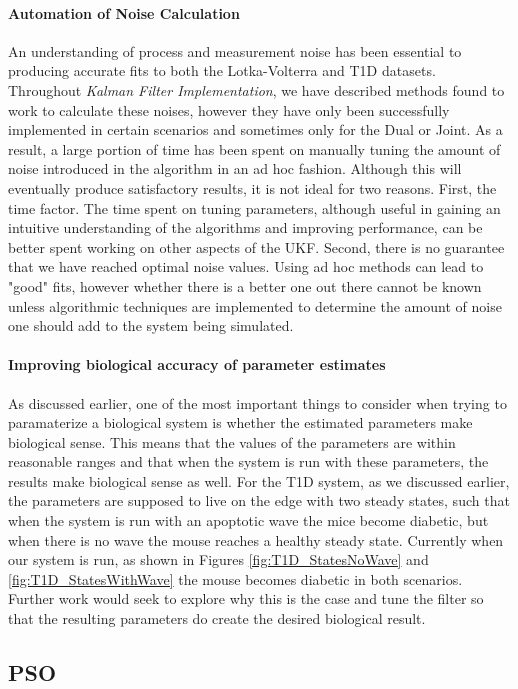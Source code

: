 \documentclass{article}
\begin{document}
\paragraph{Automation of Noise Calculation}
An understanding of process and measurement noise has been essential to producing accurate fits to both the Lotka-Volterra and T1D datasets. Throughout \emph{Kalman Filter Implementation}, we have described methods found to work to calculate these noises, however they have only been successfully implemented in certain scenarios and sometimes only for the Dual or Joint. As a result, a large portion of time has been spent on manually tuning the amount of noise introduced in the algorithm in an ad hoc fashion. Although this will eventually produce satisfactory results, it is not ideal for two reasons. First, the time factor. The time spent on tuning parameters, although useful in gaining an intuitive understanding of the algorithms and improving performance, can be better spent working on other aspects of the UKF. Second, there is no guarantee that we have reached optimal noise values. Using ad hoc methods can lead to "good" fits, however whether there is a better one out there cannot be known unless algorithmic techniques are implemented to determine the amount of noise one should add to the system being simulated.

\paragraph{Improving biological accuracy of parameter estimates}
As discussed earlier, one of the most important things to consider when trying to paramaterize a biological system is whether the estimated parameters make biological sense. This means that the values of the parameters are within reasonable ranges and that when the system is run with these parameters, the results make biological sense as well. For the T1D system, as we discussed earlier, the parameters are supposed to live on the edge with two steady states, such that when the system is run with an apoptotic wave the mice become diabetic, but when there is no wave the mouse reaches a healthy steady state. Currently when our system is run, as shown in Figures \ref{fig:T1D_StatesNoWave} and \ref{fig:T1D_StatesWithWave} the mouse becomes diabetic in both scenarios. Further work would seek to explore why this is the case and tune the filter so that the resulting parameters do create the desired biological result. 

\subsection{PSO}
\end{document}
